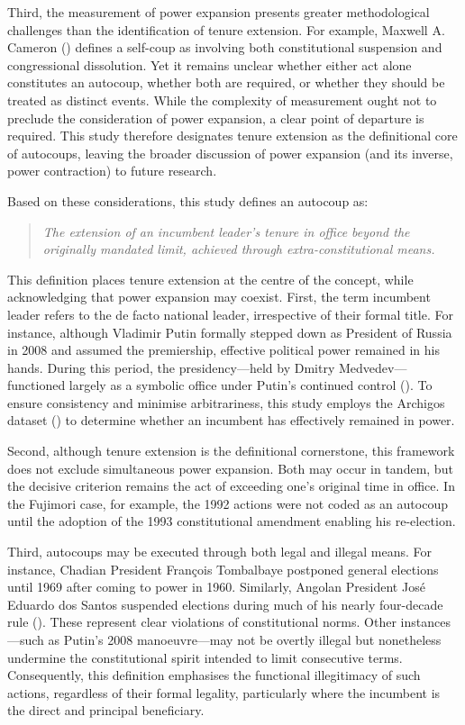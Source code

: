 \documentclass[
  12pt,
]{report}
\begin{document}
Third, the measurement of power expansion presents greater
methodological challenges than the identification of tenure extension.
For example, Maxwell A. Cameron ()
defines a self-coup as involving both constitutional suspension and
congressional dissolution. Yet it remains unclear whether either act
alone constitutes an autocoup, whether both are required, or whether
they should be treated as distinct events. While the complexity of
measurement ought not to preclude the consideration of power expansion,
a clear point of departure is required. This study therefore designates
tenure extension as the definitional core of autocoups, leaving the
broader discussion of power expansion (and its inverse, power
contraction) to future research.

Based on these considerations, this study defines an autocoup as:

\begin{quote}
\emph{The extension of an incumbent leader's tenure in office beyond the
originally mandated limit, achieved through extra-constitutional means.}
\end{quote}

This definition places tenure extension at the centre of the concept,
while acknowledging that power expansion may coexist. First, the term
incumbent leader refers to the de facto national leader, irrespective of
their formal title. For instance, although Vladimir Putin formally
stepped down as President of Russia in 2008 and assumed the premiership,
effective political power remained in his hands. During this period, the
presidency---held by Dmitry Medvedev---functioned largely as a symbolic
office under Putin's continued control
(). To ensure consistency and
minimise arbitrariness, this study employs the Archigos dataset
() to
determine whether an incumbent has effectively remained in power.

Second, although tenure extension is the definitional cornerstone, this
framework does not exclude simultaneous power expansion. Both may occur
in tandem, but the decisive criterion remains the act of exceeding one's
original time in office. In the Fujimori case, for example, the 1992
actions were not coded as an autocoup until the adoption of the 1993
constitutional amendment enabling his re-election.

Third, autocoups may be executed through both legal and illegal means.
For instance, Chadian President François Tombalbaye postponed general
elections until 1969 after coming to power in 1960. Similarly, Angolan
President José Eduardo dos Santos suspended elections during much of his
nearly four-decade rule ().
These represent clear violations of constitutional norms. Other
instances---such as Putin's 2008 manoeuvre---may not be overtly illegal
but nonetheless undermine the constitutional spirit intended to limit
consecutive terms. Consequently, this definition emphasises the
functional illegitimacy of such actions, regardless of their formal
legality, particularly where the incumbent is the direct and principal
beneficiary.
\end{document}
